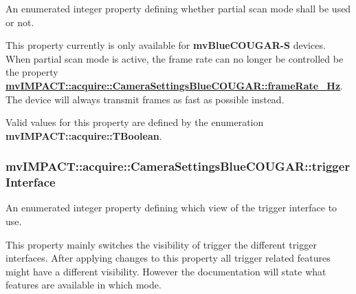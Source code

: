 An enumerated integer property defining whether partial scan mode shall be used or not. 

This property currently is only available for {\bfseries mv\+Blue\+C\+O\+U\+G\+A\+R-\/\+S} devices. When partial scan mode is active, the frame rate can no longer be controlled be the property {\bfseries \hyperlink{classmv_i_m_p_a_c_t_1_1acquire_1_1_camera_settings_blue_c_o_u_g_a_r_a56f237d32d0634054baf9f760c9d4c87}{mv\+I\+M\+P\+A\+C\+T\+::acquire\+::\+Camera\+Settings\+Blue\+C\+O\+U\+G\+A\+R\+::frame\+Rate\+\_\+\+Hz}}. The device will always transmit frames as fast as possible instead.

Valid values for this property are defined by the enumeration {\bfseries mv\+I\+M\+P\+A\+C\+T\+::acquire\+::\+T\+Boolean}. \hypertarget{classmv_i_m_p_a_c_t_1_1acquire_1_1_camera_settings_blue_c_o_u_g_a_r_a75591b5a8fc64719066e621a3b9adf47}{
\subsubsection[{trigger\+Interface}]{ mv\+I\+M\+P\+A\+C\+T\+::acquire\+::\+Camera\+Settings\+Blue\+C\+O\+U\+G\+A\+R\+::trigger\+Interface}}\label{classmv_i_m_p_a_c_t_1_1acquire_1_1_camera_settings_blue_c_o_u_g_a_r_a75591b5a8fc64719066e621a3b9adf47}


An enumerated integer property defining which view of the trigger interface to use. 

This property mainly switches the visibility of trigger the different trigger interfaces. After applying changes to this property all trigger related features might have a different visibility. However the documentation will state what features are available in which mode.

